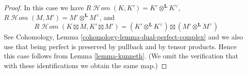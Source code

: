 \documentclass{stacks-project}
\theoremstyle{plain}
\theoremstyle{definition}
\theoremstyle{remark}
\numberwithin{equation}{subsection}
\def\SheafHom{\mathop{\mathcal{H}\!\mathit{om}}\nolimits}
\begin{document}
\begin{proof}
In this case we have $R\SheafHom(K, K') = K' \otimes^\mathbf{L} K^\vee$,
$R\SheafHom(M, M') = M' \otimes^\mathbf{L} M^\vee$, and
$$
R\SheafHom(K \boxtimes M, K' \boxtimes M') =
(K' \otimes^\mathbf{L} K^\vee) \boxtimes
(M' \otimes^\mathbf{L} M^\vee)
$$
See Cohomology, Lemma \ref{cohomology-lemma-dual-perfect-complex}
and we also use that being perfect is preserved by pullback
and by tensor products.
Hence this case follows from Lemma \ref{lemma-kunneth}.
(We omit the verification that with these identifications
we obtain the same map.)
\end{proof}
\end{document}
